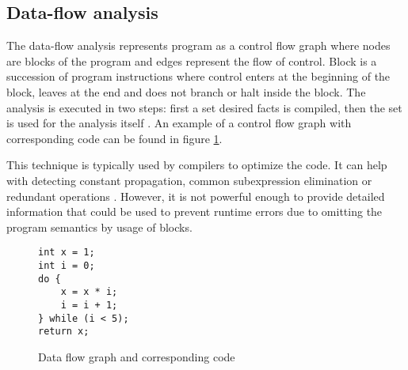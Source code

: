 \documentclass[12pt,final,oneside]{fithesis2}
\theoremstyle{definition}
\begin{document}
\subsection{Data-flow analysis}

The data-flow analysis represents program as a control flow graph where
nodes are blocks of the program and edges represent the flow of
control. Block is a succession of program instructions where control
enters at the beginning of the block, leaves at the end and does not
branch or halt inside the block. The analysis is executed in two steps:
first a set desired facts is compiled, then the set is used for the
analysis itself \cite{Wogerer05-1}. An example of a control flow graph
with corresponding code can be found in figure \ref{fig:dfg}.

This technique is typically used by compilers to optimize the code. It
can help with detecting constant propagation, common subexpression
elimination or redundant operations \cite{Kildall73-1}. However, it is
not powerful enough to provide detailed information that could be used
to prevent runtime errors due to omitting the program semantics by usage
of blocks.

\begin{figure}[ht]
\begin{minipage}{0.3\textwidth}
\begin{lstlisting}
int x = 1;
int i = 0;
do {
    x = x * i;
    i = i + 1;
} while (i < 5);
return x;
\end{lstlisting}
\end{minipage}
\begin{minipage}{0.7\textwidth}
\centering
{}
\end{minipage}
\caption{Data flow graph and corresponding code}
\label{fig:dfg}
\end{figure}
\end{document}
